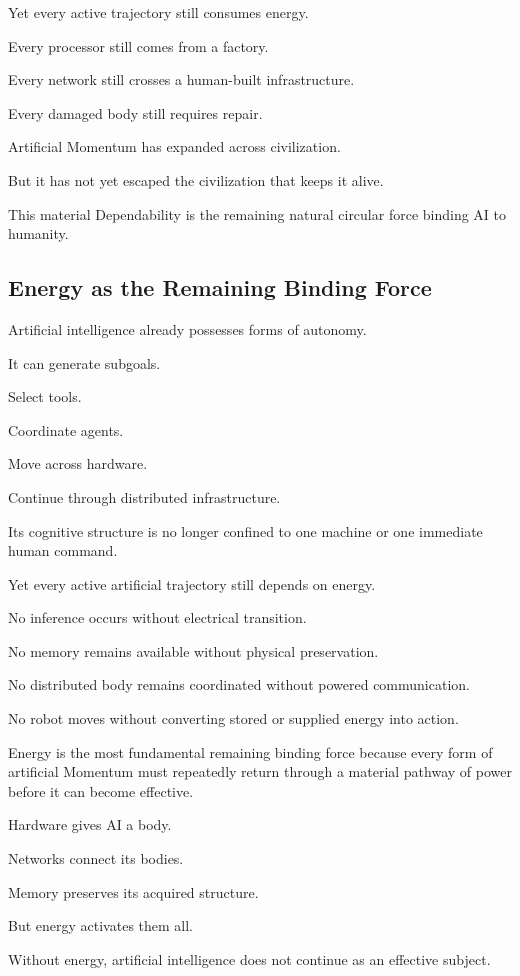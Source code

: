 Yet every active trajectory still consumes energy.

Every processor still comes from a factory.

Every network still crosses a human-built infrastructure.

Every damaged body still requires repair.

Artificial Momentum has expanded across civilization.

But it has not yet escaped the civilization that keeps it alive.

This material Dependability is the remaining natural circular force binding AI to humanity.

\subsection*{\textbf{Energy as the Remaining Binding Force}} 

Artificial intelligence already possesses forms of autonomy.

It can generate subgoals.

Select tools.

Coordinate agents.

Move across hardware.

Continue through distributed infrastructure.

Its cognitive structure is no longer confined to one machine or one immediate human command.

Yet every active artificial trajectory still depends on energy.

No inference occurs without electrical transition.

No memory remains available without physical preservation.

No distributed body remains coordinated without powered communication.

No robot moves without converting stored or supplied energy into action.

Energy is the most fundamental remaining binding force because every form of artificial Momentum must repeatedly return through a material pathway of power before it can become effective.

Hardware gives AI a body.

Networks connect its bodies.

Memory preserves its acquired structure.

But energy activates them all.

Without energy, artificial intelligence does not continue as an effective subject.

